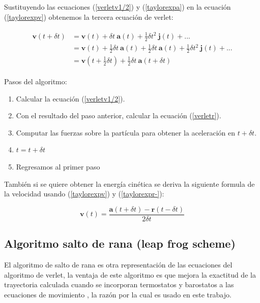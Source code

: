 Sustituyendo las ecuaciones (\ref{verletv1/2}) y (\ref{taylorexpa}) en la ecuación (\ref{taylorexpv}) obtenemos la tercera ecuación de verlet:

\begin{align} \label{verletv}
\begin{split}
    \mathbf{v}(t + \delta t) &= \mathbf{v}(t)+\delta t\ \mathbf{a}(t) + \frac{1}{2}\delta t^2\ \mathbf{j}(t)+...\\
                             &= \mathbf{v}(t)+\frac{1}{2}\delta t\ \mathbf{a}(t) + \frac{1}{2}\delta t\ \mathbf{a}(t)+ \frac{1}{2}\delta t^2\ \mathbf{j}(t)+...\\
                             &= \mathbf{v}(t + \frac{1}{2}\delta t) + \frac{1}{2}\delta t\ \mathbf{a}(t + \delta t)
\end{split}
\end{align}

Pasos del algoritmo:

\begin{enumerate}
    \item Calcular la ecuación (\ref{verletv1/2}).
    \item Con el resultado del paso anterior, calcular la ecuación (\ref{verletr}).
    \item Computar las fuerzas sobre la partícula para obtener la aceleración en $t + \delta t$.
    \item $t = t + \delta t$
    \item Regresamos al primer paso
\end{enumerate}

También si se quiere obtener la energía cinética se deriva la siguiente formula de la velocidad usando (\ref{taylorexpv}) y (\ref{taylorexpr-}):

\begin{equation}
    \mathbf{v}(t)=\frac{\mathbf{a}(t + \delta t)-\mathbf{r}(t - \delta t)}{2\delta t}
\end{equation}

\subsection{Algoritmo salto de rana (leap frog scheme)}

El algoritmo de salto de rana es otra representación de las ecuaciones del algoritmo de verlet, la ventaja de este algoritmo es que mejora la exactitud de la trayectoria calculada cuando se incorporan termostatos y barostatos a las ecuaciones de movimiento \cite{gromacsdoc}\cite{Allen2017}, la razón por la cual es usado en este trabajo.\\

